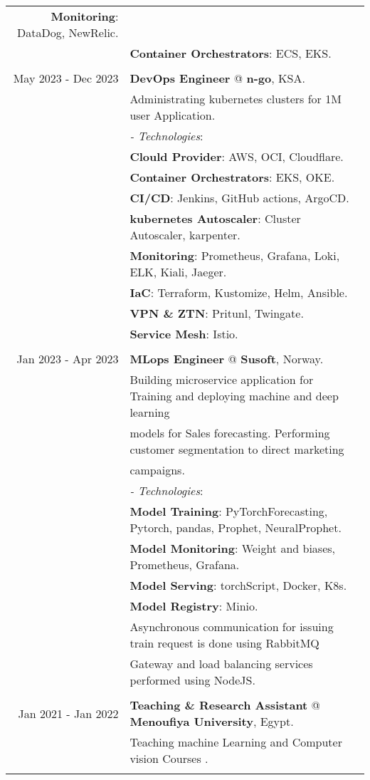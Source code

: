 \documentclass[a4paper,10pt]{article}
\begin{document}
\begin{longtable}{r|l}
    \textbf{Monitoring}: DataDog, NewRelic. \\&
    \textbf{Container Orchestrators}: ECS, EKS. \\&
    \\
    May 2023 - Dec 2023 & \textbf{DevOps Engineer} @
    \textbf{n-go}, KSA. \\&
    Administrating kubernetes clusters for 1M user Application. \\&
    \textit{- Technologies}:\\&
    \textbf{Clould Provider}: AWS, OCI, Cloudflare. \\&
    \textbf{Container Orchestrators}: EKS, OKE. \\&
    \textbf{CI/CD}: Jenkins, GitHub actions, ArgoCD. \\&
    \textbf{kubernetes Autoscaler}: Cluster Autoscaler, karpenter. \\&
    \textbf{Monitoring}: Prometheus, Grafana, Loki, ELK, Kiali, Jaeger. \\&
    \textbf{IaC}: Terraform, Kustomize, Helm, Ansible.\\&
    \textbf{VPN \& ZTN}: Pritunl, Twingate. \\&
    \textbf{Service Mesh}: Istio. \\&
    \\
    Jan 2023 - Apr 2023 & \textbf{MLops Engineer} @
    \textbf{Susoft}, Norway. \\& 
    Building microservice application for Training and deploying machine and deep learning \\& models for Sales forecasting. 
    Performing customer segmentation to direct marketing \\& campaigns. \\&
    \textit{- Technologies}:\\&
     \textbf{Model Training}: PyTorchForecasting, Pytorch, pandas, Prophet, NeuralProphet. \\&
     \textbf{Model Monitoring}: Weight and biases, Prometheus, Grafana.\\&
     \textbf{Model Serving}: torchScript, Docker, K8s. \\&
     \textbf{Model Registry}: Minio. \\&
    Asynchronous communication for issuing train request is done using RabbitMQ \\&
    Gateway and load balancing services performed using NodeJS. \\&
    \\
    Jan 2021 - Jan 2022 & \textbf{Teaching \& Research Assistant} @ 
    \textbf{Menoufiya University}, Egypt. \\&
    Teaching machine Learning and Computer vision Courses . \\&
    
\end{longtable}
\end{document}
